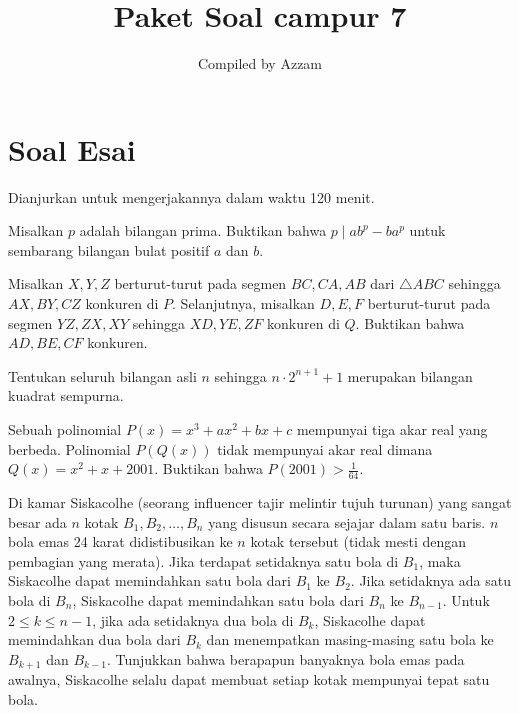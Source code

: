 \documentclass[12pt]{scrartcl}
\begin{document}
	\title{Paket Soal campur 7} %
	\date{}
	\author{Compiled by Azzam}
	\maketitle

\renewcommand*\contentsname{Daftar Isi}
\tableofcontents

\newpage
	
	
	\section{Soal Esai}
	Dianjurkan untuk mengerjakannya dalam waktu 120 menit.
	\begin{soalbaru} 
			Misalkan $p$ adalah bilangan prima. Buktikan bahwa $p \mid ab^p - ba^p$ untuk sembarang bilangan bulat positif $a$ dan $b$.
		\end{soalbaru}
		
		
		\begin{soalbaru}
				Misalkan $X,Y,Z$ berturut-turut pada segmen $BC,CA,AB$ dari $\triangle ABC$ sehingga $AX, BY, CZ$ konkuren di $P$. Selanjutnya, misalkan $D,E,F$ berturut-turut pada segmen $YZ,ZX,XY$ sehingga $XD,YE,ZF$ konkuren di $Q$. Buktikan bahwa $AD,BE,CF$ konkuren.
			\end{soalbaru}

	\begin{soalbaru}
		Tentukan seluruh bilangan asli $n$ sehingga $n\cdot 2^{n+1}+1$ merupakan bilangan kuadrat sempurna.
	\end{soalbaru}

	\begin{soalbaru}
		Sebuah polinomial $P(x)=x^3+ax^2+bx+c$ mempunyai tiga akar real yang berbeda. Polinomial $P(Q(x))$ tidak mempunyai akar real dimana $Q(x)=x^2+x+2001$. Buktikan bahwa $P(2001)>\frac{1}{64}$.
	\end{soalbaru}

	
	\begin{soalbaru}
	Di kamar Siskacolhe (seorang influencer tajir melintir tujuh turunan) yang sangat besar ada $n$ kotak $B_1,B_2,\dots,B_n$ yang disusun secara sejajar dalam satu baris. $n$ bola emas 24 karat didistibusikan ke $n$ kotak tersebut (tidak mesti dengan pembagian yang merata). Jika terdapat setidaknya satu bola di $B_1$, maka Siskacolhe dapat memindahkan satu bola dari $B_1$ ke $B_2$. Jika setidaknya ada satu bola di $B_n$, Siskacolhe dapat memindahkan satu bola dari $B_n$ ke $B_{n-1}$. Untuk $2 \le k \le n-1$, jika ada setidaknya dua bola di $B_k$, Siskacolhe dapat memindahkan dua bola dari $B_k$ dan menempatkan masing-masing satu bola ke $B_{k+1}$ dan $B_{k-1}$. Tunjukkan bahwa berapapun banyaknya bola emas pada awalnya, Siskacolhe selalu dapat membuat setiap kotak mempunyai tepat satu bola.
	\end{soalbaru}

	
\end{document}
